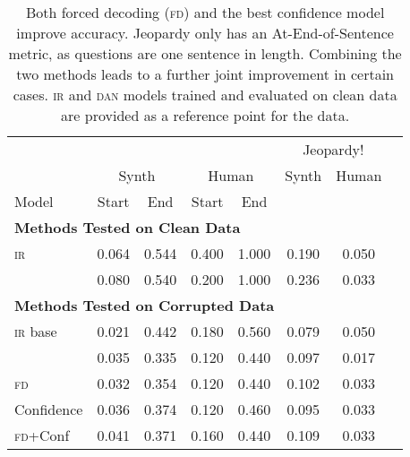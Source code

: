 \begin{table}[t]
	
	\small
	\centering
	\begin{tabular}{ l c c c  c c c c}
		&& \multicolumn{2}{c}{\qb{}}  &&  \multicolumn{2}{c}{Jeopardy!}   \\
		\cmidrule(lr) {2-5}   	\cmidrule(lr) {6-7}
		&\multicolumn{2}{c}{Synth}& \multicolumn{2}{c}{Human} & Synth & Human\\
		\cmidrule(lr){2-3} \cmidrule(lr){4-5} \cmidrule(lr){6-6}  \cmidrule(lr){7-7}
		Model & \multicolumn{1}{c}{Start}&{End}& \multicolumn{1}{c}{Start}&{End} & & \\
		\cmidrule(lr) {1-7}
		\multicolumn{6}{l}{\textbf{Methods Tested on Clean Data}}	\\
		\textsc{ir} & 0.064	& 0.544	& 0.400 & 1.000	 & 0.190 &0.050  \\
		\dan{} & 0.080 & 0.540 &0.200 & 1.000 &0.236 & 0.033 \\
		\cmidrule(lr) {1-7}
		\multicolumn{6}{l}{\textbf{Methods Tested on Corrupted Data}} \\
		\textsc{ir} base & 0.021 & 0.442 & 0.180 & 0.560 & 0.079 & 0.050 \\
		\dan{} &  0.035 & 0.335 & 0.120 & 0.440  & 0.097 & 0.017  \\
		\textsc{fd}   & 0.032 & 0.354 & 0.120  & 0.440 & 0.102 & 0.033  \\
		Confidence  & 0.036 &  0.374 & 0.120  & 0.460 & 0.095  & 0.033 \\
		\textsc{fd}+Conf &  0.041  & 0.371  & 0.160 & 0.440  &  0.109 & 0.033  \\
		

	\end{tabular}
		\caption{Both forced decoding (\textsc{fd}) and the best confidence model improve accuracy.  Jeopardy only has an At-End-of-Sentence metric, as questions are one sentence in length.    Combining the two methods leads to a further joint improvement in certain cases.  \textsc{ir} and \textsc{dan} models trained and evaluated on clean data are provided as a reference point for the \asr{} data.}
	\label{table:combination_results}
\end{table}


